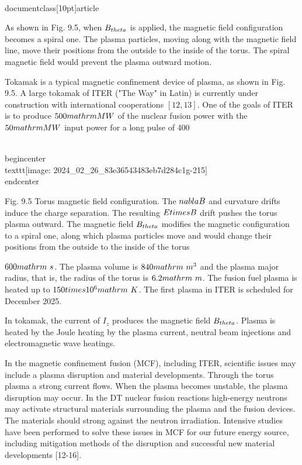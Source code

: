 \\documentclass[10pt]{article}
\begin{document}
{{{{{{As shown in Fig. 9.5, when $B_{\\theta}$ is applied, the magnetic field configuration becomes a spiral one. The plasma particles, moving along with the magnetic field line, move their positions from the outside to the inside of the torus. The spiral magnetic field would prevent the plasma outward motion.

Tokamak is a typical magnetic confinement device of plasma, as shown in Fig. 9.5. A large tokamak of ITER ("The Way" in Latin) is currently under construction with international cooperations $[12,13]$. One of the goals of ITER is to produce $500 \\mathrm{MW}$ of the nuclear fusion power with the $50 \\mathrm{MW}$ input power for a long pulse of 400

\\begin{center}
\\texttt{[image: 2024\_02\_26\_83e36543483eb7d284c1g-215]}
\\end{center}

Fig. 9.5 Torus magnetic field configuration. The $\\nabla B$ and curvature drifts induce the charge separation. The resulting $E \\times B$ drift pushes the torus plasma outward. The magnetic field $B_{\\theta}$ modifies the magnetic configuration to a spiral one, along which plasma particles move and would change their positions from the outside to the inside of the torus

$600 \\mathrm{~s}$. The plasma volume is $840 \\mathrm{~m}^{3}$ and the plasma major radius, that is, the radius of the torus is $6.2 \\mathrm{~m}$. The fusion fuel plasma is heated up to $150 \\times 10^{6} \\mathrm{~K}$. The first plasma in ITER is scheduled for December 2025.

In tokamak, the current of $I_{z}$ produces the magnetic field $B_{\\theta}$. Plasma is heated by the Joule heating by the plasma current, neutral beam injections and electromagnetic wave heatings.

In the magnetic confinement fusion (MCF), including ITER, scientific issues may include a plasma disruption and material developments. Through the torus plasma a strong current flows. When the plasma becomes unstable, the plasma disruption may occur. In the DT nuclear fusion reactions high-energy neutrons may activate structural materials surrounding the plasma and the fusion devices. The materials should strong against the neutron irradiation. Intensive studies have been performed to solve these issues in MCF for our future energy source, including mitigation methods of the disruption and successful new material developments [12-16].

}}}}}}
\end{document}
